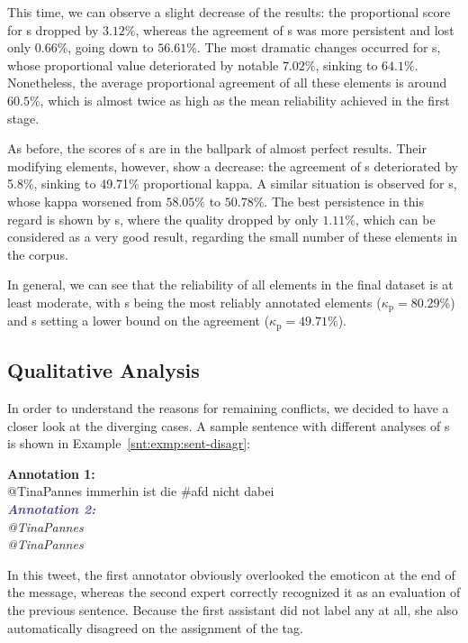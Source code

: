 This time, we can observe a slight decrease of the results: the
proportional score for s dropped by $3.12\%$,
whereas the agreement of s was more persistent and
lost only $0.66\%$, going down to $56.61\%$.  The most dramatic
changes occurred for s, whose proportional value
deteriorated by notable $7.02\%$, sinking to $64.1\%$.  Nonetheless,
the average proportional agreement of all these elements is around
$60.5\%$, which is almost twice as high as the mean reliability
achieved in the first stage.

As before, the scores of s are in the ballpark of
almost perfect results.  Their modifying elements, however, show a
decrease: the agreement of s deteriorated by
5.8\%, sinking to 49.71\% proportional kappa.  A similar situation is
observed for s, whose kappa worsened from
$58.05\%$ to $50.78\%$.  The best persistence in this regard is shown
by s, where the quality dropped by only $1.11\%$,
which can be considered as a very good result, regarding the small
number of these elements in the corpus.

In general, we can see that the reliability of all elements in the
final dataset is at least moderate, with s being
the most reliably annotated elements ($\kappa_{\textrm{p}}=80.29\%$)
and s setting a lower bound on the agreement
($\kappa_{\textrm{p}}=49.71\%$).

\subsection{Qualitative Analysis}\label{subsec:eval-qualitative-analysis}

In order to understand the reasons for remaining conflicts, we decided
to have a closer look at the diverging cases.  A sample sentence with
different analyses of s is shown in
Example~\ref{snt:exmp:sent-disagr}:
\begin{example}\label{snt:exmp:sent-disagr}
  \textcolor{red3}{\textbf{Annotation 1:}}\\ \upshape{}@TinaPannes
  immerhin ist die \#afd nicht dabei \smiley{}\\[0.8em]\itshape
  \noindent\textcolor{darkslateblue}{\textbf{\itshape Annotation
      2:}}\\ \upshape{}@TinaPannes
  \\[0.8em]
  \noindent\itshape{}@TinaPannes
  \upshape{}
\end{example}
In this tweet, the first annotator obviously overlooked the emoticon
\smiley{} at the end of the message, whereas the second expert
correctly recognized it as an evaluation of the previous sentence.
Because the first assistant did not label any  at
all, she also automatically disagreed on the assignment of the
 tag.

